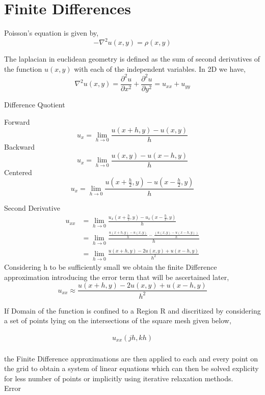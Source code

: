 \documentclass[letterpaper,11pt]{report}
\numberwithin{equation}{section}
\newcommand{\pa}{\partial}
\begin{document}
    
\section{Finite Differences}
Poisson's equation is given by,
\begin{equation}
    -\nabla^2 u(x,y) = \rho(x,y)    
\end{equation}

The laplacian in euclidean geometry is defined as the sum of second derivatives of the function $u(x,y)$ with each of the independent variables.
In 2D we have,
\begin{equation}
    \nabla^2 u(x,y) = \frac{\pa ^2 u}{\pa x^2} + \frac{\pa ^2 u}{\pa y^2} = u_{xx} + u_{yy}    
\end{equation}

{\Large Difference Quotient}

    Forward
    \[
        u_x = \lim_{h \rightarrow 0} \frac{u(x+h,y) - u(x,y)}{h}
    \] 
    Backward
    \[
        u_x = \lim_{h \rightarrow 0} \frac{u(x,y) - u(x-h,y)}{h}
    \]
    Centered
    \[
        u_x = \lim_{h \rightarrow 0} \frac{u(x+\frac{h}{2},y) - u(x-\frac{h}{2},y)}{h}
    \]

    Second Derivative
    \begin{align*}
        u_{xx} &= \lim_{h \rightarrow 0} \frac{u_x(x+\frac{h}{2},y) - u_x(x-\frac{h}{2},y)}{h} \\
        &= \lim_{h \rightarrow 0} \frac{\frac{u(x+h,y) - u(x,y)}{h} - \frac{(u(x,y)- u(x-h,y))}{h}}{h}\\
        &= \lim_{h \rightarrow 0}\frac{u(x+h,y)-2 u(x,y) + u(x-h,y)}{h^2}
    \end{align*}
    Considering h to be sufficiently small we obtain the finite Difference approximation introducing the error term that will be ascertained later,
    \begin{equation}
        u_{xx} \approx \frac{u(x+h,y)-2 u(x,y) + u(x-h,y)}{h^2}
    \end{equation}

    If Domain of the function is confined to a Region R and discritized by considering a set of points lying on the intersections of the square mesh given below,
    
    \begin{align*}
        u_{xx}(jh,kh)
    \end{align*}
    \\[2mm] the Finite Difference approximations are then applied to each and every point on the grid to obtain a system of linear equations which can then be solved explicity for less number of points or implicitly using iterative relaxation methods.
    \\[2mm]


    {\Large Error}
    
    
    
     
\end{document}
